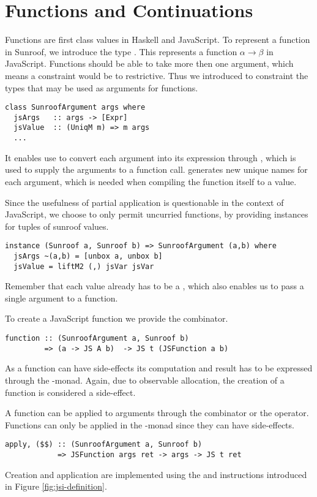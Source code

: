  
\section{Functions and Continuations}
\label{sec:functions-continuations}

Functions are first class values in Haskell and JavaScript.
To represent a function in Sunroof, we introduce the type 
. This represents a function
$\alpha \rightarrow \beta$ in JavaScript. Functions should
be able to take more then one argument, which means a 
 constraint would be to restrictive.
Thus we introduced  to constraint the 
types that may be used as arguments for functions.
\begin{verbatim}
class SunroofArgument args where
  jsArgs   :: args -> [Expr]
  jsValue  :: (UniqM m) => m args
  ...
\end{verbatim}
It enables use to convert each argument into its expression
through , which is used to supply the
arguments to a function call.  generates
new unique names for each argument, which is needed when compiling
the function itself to a value. 

Since the usefulness of partial application is questionable in
the context of JavaScript, we choose to only permit uncurried functions,
by providing instances for tuples of sunroof values.
\begin{verbatim}
instance (Sunroof a, Sunroof b) => SunroofArgument (a,b) where
  jsArgs ~(a,b) = [unbox a, unbox b]
  jsValue = liftM2 (,) jsVar jsVar
\end{verbatim}
Remember that each  value already has to be 
a , which also enables us to pass a single argument
to a function. 

To create a JavaScript function we provide the  combinator.
\begin{verbatim}
function :: (SunroofArgument a, Sunroof b) 
         => (a -> JS A b)  -> JS t (JSFunction a b)
\end{verbatim}
As a function can have side-effects its computation and result has to be 
expressed through the \JS-monad. Again, due to observable allocation,
the creation of a function is considered a side-effect.

A function can be applied to arguments through the  combinator
or the \Src{\$\$} operator.
Functions can only be applied in the \JS-monad since they can have side-effects.
\begin{verbatim}
apply, ($$) :: (SunroofArgument a, Sunroof b) 
            => JSFunction args ret -> args -> JS t ret
\end{verbatim}
Creation and application are implemented using the 
and  instructions introduced in 
Figure \ref{fig:jsi-definition}.

